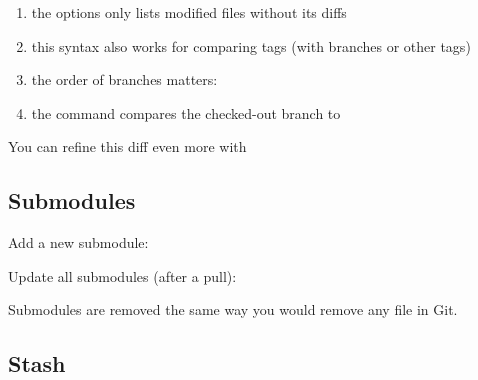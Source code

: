 \begin{enumerate}
	\item the  options only lists modified files without its diffs
	\item this syntax also works for comparing tags (with branches or other tags)
	\item the order of branches matters: 
	\item the command  compares the checked-out branch to 
\end{enumerate}

\begin{flushleft}
	You can refine this diff even more with
\end{flushleft}

\begin{flushleft}
\end{flushleft}


\subsection{Submodules}\label{git-submodule}

\begin{flushleft}
	Add a new submodule:
\end{flushleft}

\begin{flushleft}
\end{flushleft}

\begin{flushleft}
	Update all submodules (after a pull):
\end{flushleft}

\begin{flushleft}
\end{flushleft}

\begin{flushleft}
	Submodules are removed the same way you would remove any file in Git.
\end{flushleft}


\subsection{Stash}\label{git-stash}

